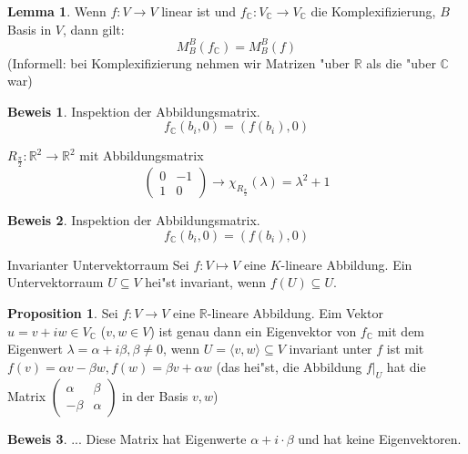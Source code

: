 \documentclass[fontsize=11pt,paper=a4,BCOR=0mm,DIV=11,automark,headsepline]{scrbook}
\theoremstyle{remark}
\theoremstyle{definition}
\newtheorem*{proposition}{Proposition}
\newtheorem{lemma}{Lemma}[section]
\theoremstyle{proof}
\newtheorem*{prof}{Beweis}
\theoremstyle{remark}
\begin{document}
\begin{lemma}
  Wenn $f: V\to V$ linear ist und \(f_{\mathbb{C}}: V_{\mathbb{C}} \to V_{\mathbb{C}}\) die Komplexifizierung, $B$ Basis
  in $V$, dann gilt: \[M^B_B(f_{\mathbb{C}}) = M^B_B(f)\] (Informell: bei Komplexifizierung nehmen wir Matrizen "uber \(\mathbb{R}\) als die "uber \(\mathbb{C}\) war)
\end{lemma}

\begin{prof}
  Inspektion der Abbildungsmatrix. \[f_{\mathbb{C}}(b_i,0) = (f(b_i), 0)\]
\end{prof}
\begin{exa}
  \(R_{\frac{\pi}{2}}: \mathbb{R}^2\to\mathbb{R}^2\) mit Abbildungsmatrix
  \[
    \begin{pmatrix}
      0 & -1 \\
      1 & 0
    \end{pmatrix}
    \rightarrow \chi_{R_{\frac{\pi}{2}}}(\lambda) = \lambda^2 + 1
\]
\end{exa}

\begin{prof}
  Inspektion der Abbildungsmatrix. \[f_{\mathbb{C}}(b_i,0) = (f(b_i), 0)\]
\end{prof}

\begin{definition}{Invarianter Untervektorraum}{}
  Sei $f: V \mapsto V$ eine $K$-lineare Abbildung. Ein Untervektorraum
  $U\subseteq V$ hei"st invariant, wenn $f(U) \subseteq U$.
\end{definition}

\begin{proposition}
  Sei $f: V\to V$ eine \(\mathbb{R}\)-lineare Abbildung. Eim Vektor \(u = v + iw \in V_{\mathbb{C}}\) (\(v, w \in V\)) ist genau dann ein
  Eigenvektor von \(f_{\mathbb{C}}\) mit dem Eigenwert \(\lambda = \alpha + i\beta, \beta\neq 0\), wenn \(U = \langle v, w\rangle\subseteq V\) invariant unter $f$ ist
  mit \(f(v) = \alpha v - \beta w, f(w) = \beta v + \alpha w\) (das hei"st, die Abbildung \(f|_U\) hat die Matrix \(
  \begin{pmatrix}
    \alpha & \beta \\
    -\beta & \alpha
  \end{pmatrix}
\) in der Basis \(v, w\))
\end{proposition}
\begin{prof}
  ... Diese Matrix hat Eigenwerte $\alpha + i\cdot\beta$ und hat keine
  Eigenvektoren.
\end{prof}
\end{document}
